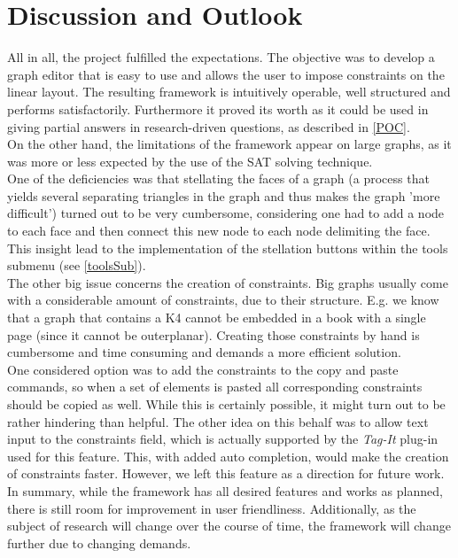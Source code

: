
\chapter{Discussion and Outlook}
  \label{Discussion}

All in all, the project fulfilled the expectations. The objective was to develop a graph editor that is easy to use and allows the user to impose constraints on the linear layout. The resulting framework is intuitively operable, well structured and performs satisfactorily. Furthermore it proved its worth as it could be used in giving partial answers in research-driven questions, as described in \autoref{POC}.\\
On the other hand, the limitations of the framework appear on large graphs, as it was more or less expected by the use of the SAT solving technique.\\
One of the deficiencies was that stellating the faces of a graph (a process that yields several separating triangles in the graph and thus makes the graph 'more difficult') turned out to be very cumbersome, considering one had to add a node to each face and then connect this new node to each node delimiting the face. This insight lead to the implementation of the stellation buttons within the tools submenu (see \autoref{toolsSub}).\\
The other big issue concerns the creation of constraints. Big graphs usually come with a considerable amount of constraints, due to their structure. E.g. we know that a graph that contains a K4 cannot be embedded in a book with a single page (since it cannot be outerplanar). Creating those constraints by hand is cumbersome and time consuming and demands a more efficient solution.\\
One considered option was to add the constraints to the copy and paste commands, so when a set of elements is pasted all corresponding constraints should be copied as well. While this is certainly possible, it might turn out to be rather hindering than helpful. The other idea on this behalf was to allow text input to the constraints field, which is actually supported by the \textit{Tag-It} plug-in used for this feature. This, with added auto completion, would make the creation of constraints faster. However, we left this feature as a direction for future work. \\
In summary, while the framework has all desired features and works as planned, there is still room for improvement in user friendliness. Additionally, as the subject of research will change over the course of time, the framework will change further due to changing demands.\\


